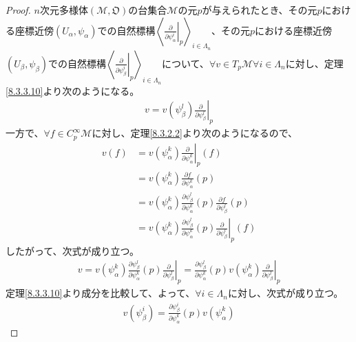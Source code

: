 \documentclass[dvipdfmx]{jsarticle}
\begin{document}
\begin{proof}
  $n$次元多様体$\left(\mathcal{M},\mathfrak{O}\right)$の台集合$\mathcal{M}$の元$p$が与えられたとき、その元$p$における座標近傍$\left(U_\alpha,\psi_\alpha \right)$での自然標構$\left\langle \left. \frac{\partial}{\partial \psi^i_\alpha }\right|_p \right\rangle_{i\in \varLambda_n} $、その元$p$における座標近傍$\left(U_\beta ,\psi_\beta \right)$での自然標構$\left\langle \left. \frac{\partial}{\partial \psi^i_\beta }\right|_p \right\rangle_{i\in \varLambda_n} $について、$\forall v\in T_p \mathcal{M} \forall i\in \varLambda_n $に対し、定理\ref{8.3.3.10}より次のようになる。
  \begin{align*}
    v=v\left(\psi^l_\beta \right) \left. \frac{\partial}{\partial \psi_\beta^l } \right|_p 
  \end{align*}
  一方で、$\forall f\in C^\infty_p \mathcal{M}$に対し、定理\ref{8.3.2.2}より次のようになるので、
  \begin{align*}
    v\left(f\right) &= v\left(\psi^k_\alpha \right) \left. \frac{\partial }{\partial \psi^k_\alpha } \right|_p \left(f\right) \\
    &= v\left(\psi^k_\alpha \right) \frac{\partial f}{\partial \psi^k_\alpha } \left(p\right) \\
    &= v\left(\psi^k_\alpha \right) \frac{\partial \psi^l_\beta }{\partial \psi^k_\alpha } \left(p\right) \frac{\partial f}{\partial \psi^l_\beta } \left(p\right) \\
    &= v\left(\psi^k_\alpha \right) \frac{\partial \psi^l_\beta }{\partial \psi^k_\alpha } \left(p\right) \left. \frac{\partial }{\partial \psi^l_\beta } \right|_p \left(f\right) 
  \end{align*}
  したがって、次式が成り立つ。
  \begin{align*}
    v=v\left(\psi^k_\alpha \right) \frac{\partial \psi^l_\beta }{\partial \psi^k_\alpha } \left(p\right) \left. \frac{\partial }{\partial \psi^l_\beta } \right|_p =\frac{\partial \psi^l_\beta }{\partial \psi^k_\alpha } \left(p\right) v\left(\psi^k_\alpha \right) \left. \frac{\partial }{\partial \psi^l_\beta } \right|_p
  \end{align*}
  定理\ref{8.3.3.10}より成分を比較して、よって、$\forall i\in \varLambda_n $に対し、次式が成り立つ。
  \begin{align*}
    v\left( \psi^i_\beta \right)=\frac{\partial \psi^i_\beta }{\partial \psi^k_\alpha } \left(p\right) v\left(\psi^k_\alpha \right)  
  \end{align*}
\end{proof}
\end{document}
